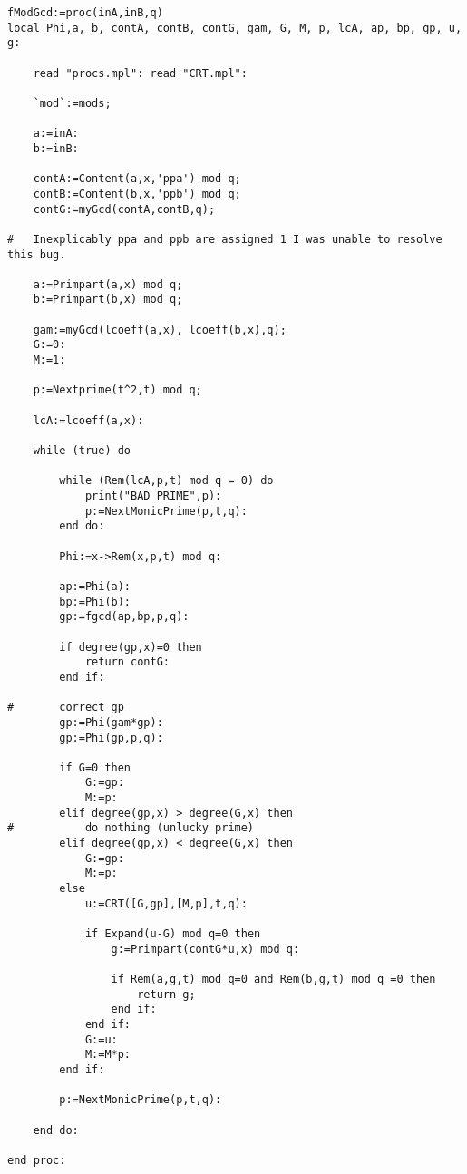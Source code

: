 \documentclass[10pt]{report}
\theoremstyle{plain}
\theoremstyle{definition}
\begin{document}
\begin{verbatim}
fModGcd:=proc(inA,inB,q)
local Phi,a, b, contA, contB, contG, gam, G, M, p, lcA, ap, bp, gp, u, g:
    
    read "procs.mpl": read "CRT.mpl":
    
    `mod`:=mods;
    
    a:=inA:
    b:=inB:
    
    contA:=Content(a,x,'ppa') mod q;
    contB:=Content(b,x,'ppb') mod q;
    contG:=myGcd(contA,contB,q);
    
#   Inexplicably ppa and ppb are assigned 1 I was unable to resolve this bug.
    
    a:=Primpart(a,x) mod q;
    b:=Primpart(b,x) mod q;
    
    gam:=myGcd(lcoeff(a,x), lcoeff(b,x),q);
    G:=0:
    M:=1:
    
    p:=Nextprime(t^2,t) mod q;
    
    lcA:=lcoeff(a,x):
    
    while (true) do
        
        while (Rem(lcA,p,t) mod q = 0) do 
            print("BAD PRIME",p):
            p:=NextMonicPrime(p,t,q):
        end do:
        
        Phi:=x->Rem(x,p,t) mod q:
        
        ap:=Phi(a):
        bp:=Phi(b):
        gp:=fgcd(ap,bp,p,q):
        
        if degree(gp,x)=0 then 
            return contG:
        end if:
        
#       correct gp
        gp:=Phi(gam*gp):
        gp:=Phi(gp,p,q):
        
        if G=0 then
            G:=gp:
            M:=p:
        elif degree(gp,x) > degree(G,x) then
#           do nothing (unlucky prime)
        elif degree(gp,x) < degree(G,x) then
            G:=gp:
            M:=p:
        else
            u:=CRT([G,gp],[M,p],t,q):
            
            if Expand(u-G) mod q=0 then
                g:=Primpart(contG*u,x) mod q:
                
                if Rem(a,g,t) mod q=0 and Rem(b,g,t) mod q =0 then
                    return g;
                end if:
            end if:
            G:=u:
            M:=M*p:
        end if:
        
        p:=NextMonicPrime(p,t,q):
        
    end do:
    
end proc:
\end{verbatim}
\end{document}
